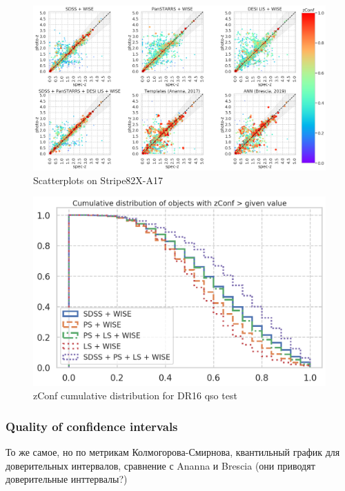 

\begin{figure}
    \centering
    \includegraphics[width=\linewidth]{images/scatterplots-s82x-a17-all30sec.png}
    \caption{Scatterplots on Stripe82X-A17}
    \label{fig:my_label}
\end{figure}

\begin{figure}
    \centering
    \includegraphics[width=\linewidth]{images/zconfs2-dr16qso.png}
    \caption{zConf cumulative distribution for DR16 qso test}
    \label{fig:zconfs2-dr16qso}
\end{figure}

\subsubsection{Quality of confidence intervals}

То же самое, но по метрикам Колмогорова-Смирнова, квантильный график для доверительных интервалов, сравнение с Ananna и Brescia (они приводят доверительные инттервалы?)

